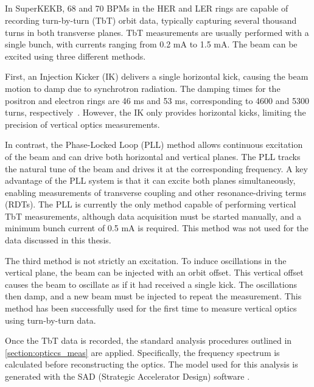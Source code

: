 \subsection{}

In SuperKEKB, 68 and 70 BPMs in the HER and LER rings are capable of recording turn-by-turn (TbT)
orbit data, typically capturing several thousand turns in both transverse planes. TbT measurements
are usually performed with a single bunch, with currents ranging from 0.2 mA to 1.5 mA. The beam can
be excited using three different methods.

First, an Injection Kicker (IK) delivers a single horizontal kick, causing the beam motion to damp
due to synchrotron radiation. The damping times for the positron and electron rings are 46 ms and 53
ms, corresponding to 4600 and 5300 turns, respectively~\cite{keintzel_jacqueline_beam_2022}.
However, the IK only provides horizontal kicks, limiting the precision of vertical optics
measurements.

In contrast, the Phase-Locked Loop (PLL) method allows continuous excitation of the beam and can
drive both horizontal and vertical planes. The PLL tracks the natural tune of the beam and drives it
at the corresponding frequency. A key advantage of the PLL system is that it can excite both planes
simultaneously, enabling measurements of transverse coupling and other resonance-driving terms
(RDTs). The PLL is currently the only method capable of performing vertical TbT measurements,
although data acquisition must be started manually, and a minimum bunch current of 0.5 mA is
required. This method was not used for the data discussed in this thesis.

The third method is not strictly an excitation. To induce oscillations in the vertical plane, the 
beam can be injected with an orbit offset. This vertical offset causes the beam to oscillate as if 
it had received a single kick. The oscillations then damp, and a new beam must be injected to repeat 
the measurement. This method has been successfully used for the first time to measure vertical
optics using turn-by-turn data.

Once the TbT data is recorded, the standard analysis procedures outlined in
\cref{section:opticcs_meas} are applied. Specifically, the frequency spectrum is calculated before
reconstructing the optics. The model used for this analysis is generated with the SAD (Strategic
Accelerator Design) software \cite{noauthor_sad_nodate}.


